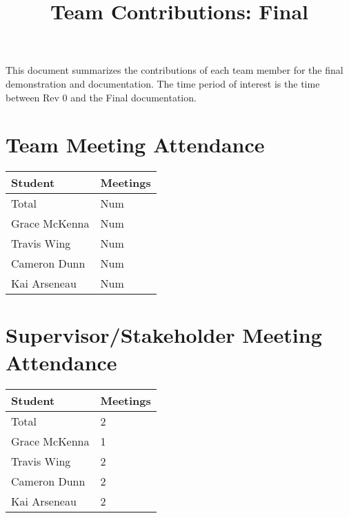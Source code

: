 \documentclass{article}
\title{Team Contributions: Final\\\progname}
\author{\authname}
\date{}
\begin{document}
\maketitle

This document summarizes the contributions of each team member for the final
demonstration and documentation.  The time period of interest is the time
between Rev 0 and the Final documentation.

\section{Team Meeting Attendance}


\begin{table}[H]
\centering
\begin{tabular}{ll}
\toprule
\textbf{Student} & \textbf{Meetings}\\
\midrule
Total & Num\\
Grace McKenna & Num\\
Travis Wing & Num\\
Cameron Dunn & Num\\
Kai Arseneau & Num\\
\bottomrule
\end{tabular}
\end{table}


\section{Supervisor/Stakeholder Meeting Attendance}

\begin{table}[H]
\centering
\begin{tabular}{ll}
\toprule
\textbf{Student} & \textbf{Meetings}\\
\midrule
Total & 2 \\
Grace McKenna & 1\\
Travis Wing & 2\\
Cameron Dunn & 2\\
Kai Arseneau & 2\\
\bottomrule
\end{tabular}
\end{table}
\end{document}
